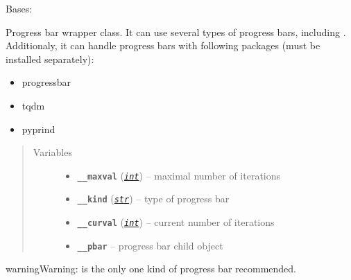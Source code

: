 \documentclass[a4paper,10pt,english]{sphinxmanual}
\begin{document}
\begin{fulllineitems}
\label{aqueduct.utils.log:aqueduct.utils.log.pbar}
Bases: \href{http://docs.python.org/2/library/functions.html\#object}{}

Progress bar wrapper class.
It can use several types of progress bars, including {\hyperref[aqueduct.utils.log:aqueduct.utils.log.SimpleProgressBar]{}}. Additionaly, it can
handle progress bars with following packages (must be installed separately):
\begin{itemize}
\item {} 
progressbar

\item {} 
tqdm

\item {} 
pyprind

\end{itemize}
\begin{quote}\begin{description}
\item[{Variables}] \leavevmode\begin{itemize}
\item {} 
\textbf{\texttt{\_\_maxval}} (\href{http://docs.python.org/2/library/functions.html\#int}{\emph{\texttt{int}}}) -- maximal number of iterations

\item {} 
\textbf{\texttt{\_\_kind}} (\href{http://docs.python.org/2/library/functions.html\#str}{\emph{\texttt{str}}}) -- type of progress bar

\item {} 
\textbf{\texttt{\_\_curval}} (\href{http://docs.python.org/2/library/functions.html\#int}{\emph{\texttt{int}}}) -- current number of iterations

\item {} 
\textbf{\texttt{\_\_pbar}} -- progress bar child object

\end{itemize}

\end{description}\end{quote}

\begin{notice}{warning}{Warning:}
{\hyperref[aqueduct.utils.log:aqueduct.utils.log.SimpleProgressBar]{}} is the only one kind of progress bar recommended.
\end{notice}


\end{fulllineitems}
\end{document}
